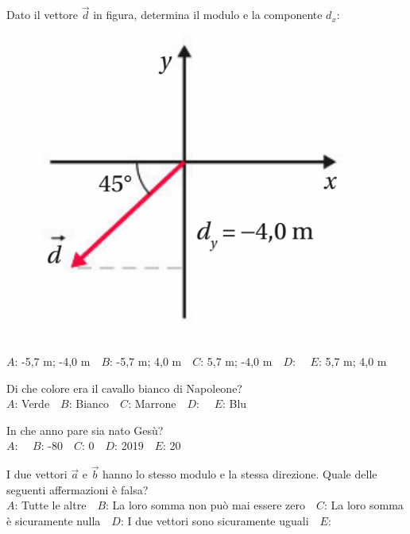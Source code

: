 \mcquestionheader Dato il vettore $\vec{d}$ in figura, determina il modulo e la componente $d_x$: \begin{figure}[h!]   \begin{center}     \includegraphics[scale=0.35]{vettored.png}   \end{center} \end{figure}\\
{$A$}: -5,7 m; -4,0 m\ \ {$B$}: -5,7 m; 4,0 m\ \ {$C$}: 5,7 m; -4,0 m\ \ {$D$}: \ \ {$E$}: 5,7 m; 4,0 m\ \ 

\mcquestionfooter



\def\mcquestionnumber{8}


\mcquestionheader Di che colore era il cavallo bianco di Napoleone?\\
{$A$}: Verde\ \ {$B$}: Bianco\ \ {$C$}: Marrone\ \ {$D$}: \ \ {$E$}: Blu\ \ 

\mcquestionfooter



\def\mcquestionnumber{9}


\mcquestionheader In che anno pare sia nato Gesù?\\
{$A$}: \ \ {$B$}: -80\ \ {$C$}: 0\ \ {$D$}: 2019\ \ {$E$}: 20\ \ 

\mcquestionfooter



\def\mcquestionnumber{10}


\mcquestionheader I due vettori $\vec{a}$ e $\vec{b}$ hanno lo stesso modulo e la stessa direzione. Quale delle seguenti affermazioni è falsa?\\
{$A$}: Tutte le altre\ \ {$B$}: La loro somma non può mai essere zero\ \ {$C$}: La loro somma è sicuramente nulla\ \ {$D$}: I due vettori sono sicuramente uguali\ \ {$E$}: \ \ 


